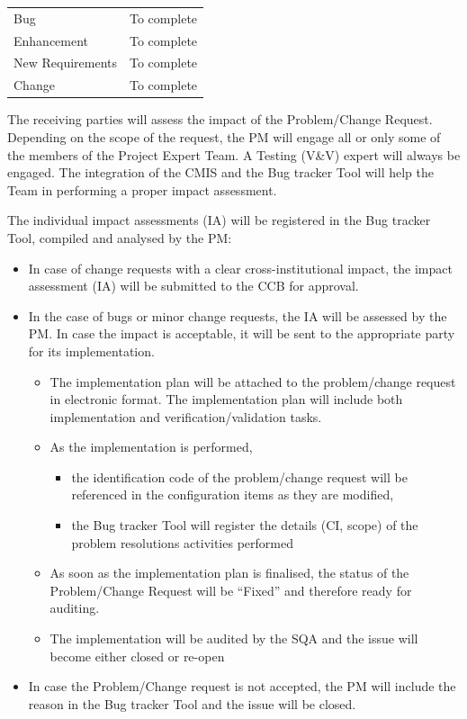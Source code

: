 \documentclass{template/openetcs_article}
\begin{document}
\begin{flushleft}
\tablefirsthead{}
\tablehead{}
\tabletail{}
\tablelasttail{}
\begin{tabular}{|m{3cm}|m{11cm}|}
\hline
\rowcolor{myblue}
\multicolumn{2}{|c|}{Classification}\\\hline
Bug &
To complete\\\hline
Enhancement &
To complete\\\hline
New Requirements &
To complete\\\hline
Change &
To complete\\\hline
\end{tabular}
\end{flushleft}

The receiving parties will assess the impact of the Problem/Change Request. Depending on the scope of the request, the PM will engage all or only some of the members of the Project Expert Team. A Testing (V\&V) expert will always be engaged. The integration of the CMIS and the Bug tracker Tool will help the Team in performing a proper impact assessment. 



The individual impact assessments (IA) will be registered in the Bug tracker Tool, compiled and analysed by the PM:
\begin{itemize}
\item In case of change requests with a clear cross-institutional impact, the impact assessment (IA) will be submitted to the CCB for approval.
\item In the case of bugs or minor change requests, the IA will be assessed by the PM. In case the impact is acceptable, it will be sent to the appropriate party for its implementation.
\begin{itemize}
\item The implementation plan will be attached to the problem/change request in electronic format. The implementation plan will include both implementation and verification/validation tasks.
\item As the implementation is performed, 
\begin{itemize}
\item the identification code of the problem/change request will be referenced in the configuration items as they are modified, 
\item the Bug tracker Tool will register the details (CI, scope) of the problem resolutions activities performed
\end{itemize}
\item As soon as the implementation plan is finalised, the status of the Problem/Change Request will be ``Fixed'' and therefore ready for auditing.
\item The implementation will be audited by the SQA and the issue will become either closed or re-open
\end{itemize}
\item In case the Problem/Change request is not accepted, the PM will include the reason in the Bug tracker Tool and the issue will be closed. 
\end{itemize}
\end{document}
